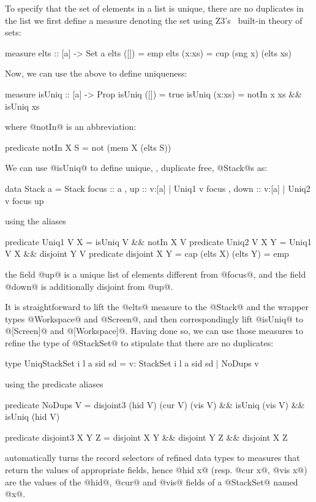  To specify that the set of elements
in a list is unique, \ie there are no duplicates in the list we first define
a measure denoting the set using Z3's~\citep{Z3} built-in theory of sets:
%
\begin{code}
  measure elts :: [a] -> Set a 
  elts ([])   = emp  
  elts (x:xs) = cup (sng x) (elts xs) 
\end{code}
%
Now, we can use the above to define uniqueness:
%
\begin{code}
  measure isUniq :: [a] -> Prop 
  isUniq ([])   =  true 
  isUniq (x:xs) =  notIn x xs && isUniq xs
\end{code}
%
where @notIn@ is an abbreviation: 
%
\begin{code}
  predicate notIn X S = not (mem X (elts S))
\end{code}

We can use @isUniq@ to define unique, \ie, duplicate free,
@Stack@s as:
%
\begin{code}
  data Stack a = Stack 
   { focus :: a   
   , up    :: {v:[a] | Uniq1 v focus}
   , down  :: {v:[a] | Uniq2 v focus up} }
\end{code}
%
using the aliases
%
\begin{code}
  predicate Uniq1 V X    
    = isUniq V  && notIn X V
  predicate Uniq2 V X Y  
    = Uniq1 V X && disjoint Y V
  predicate disjoint X Y 
    = cap (elts X) (elts Y) = emp
\end{code}
%
\ie the field @up@ is a unique list of elements different 
from @focus@, and the field @down@ is additionally disjoint 
from @up@.

It is straightforward to lift the @elts@ measure to 
the @Stack@ and the wrapper types @Workspace@ and 
@Screen@, and then correspondingly lift @isUniq@ to 
@[Screen]@ and \hbox{@[Workspace]@.}
%
Having done so, we can use those measures to refine 
the type of @StackSet@ to stipulate that there are 
no duplicates:
%
\begin{code}
  type UniqStackSet i l a sid sd 
    = {v: StackSet i l a sid sd | NoDups v} 
\end{code}
%
using the predicate aliases
%
\begin{code}
  predicate NoDups V 
    =  disjoint3 (hid V) (cur V) (vis V) 
    && isUniq (vis V)
    && isUniq (hid V)
  
  predicate disjoint3 X Y Z 
    =  disjoint X Y
    && disjoint Y Z
    && disjoint X Z
\end{code}
%
\toolname automatically turns the record selectors of 
refined data types to measures that return the values 
of appropriate fields, hence @hid x@ (resp. @cur x@, @vis x@)
are the values of the \hbox{@hid@,} @cur@ and @vis@ fields of
a @StackSet@ named @x@.

